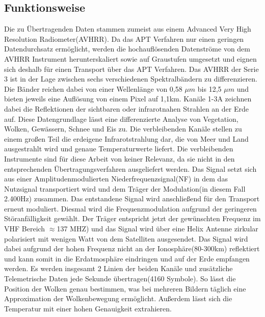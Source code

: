 \subsection*{Funktionsweise}
\begin{multicols*}{2}
    Die zu Übertragenden Daten stammen zumeist aus einem \glqq Advanced Very High Resolution Radiometer\grqq (AVHRR). Da das APT Verfahren nur einen geringen Datendurchsatz ermöglicht, werden die hochauflösenden Datenströme von dem AVHRR Instrument herunterskaliert sowie auf Graustufen umgesetzt und eignen sich deshalb für einen Transport über das APT Verfahren. Das AVHRR der Serie 3 ist in der Lage zwischen sechs verschiedenen Spektralbändern zu differenzieren. Die Bänder reichen dabei von einer Wellenlänge von 0,58 \( \mu m\) bis 12,5 \( \mu m\) und bieten jeweils eine Auflösung von einem Pixel auf 1,1km. Kanäle 1-3A zeichnen dabei die Reflektionen der sichtbaren oder infrarotnahen Strahlen an der Erde auf. 
    Diese Datengrundlage lässt eine differenzierte Analyse von Vegetation, Wolken, Gewässern, Schnee und Eis zu. Die verbleibenden Kanäle stellen zu einem großen Teil die erdeigene Infrarotstrahlung dar, die von Meer und Land ausgestrahlt wird und genaue Temperaturwerte liefert. 
    Die verbleibenden Instrumente sind für diese Arbeit von keiner Relevanz, da sie nicht in den entsprechenden Übertragungsverfahren ausgeliefert werden. 
    \cite{Apt-System} 
    Das Signal setzt sich aus einer Amplitudenmodulierten Niederfrequenzsignal(NF) in dem das Nutzsignal transportiert wird und dem Träger der Modulation(in diesem Fall 2.400Hz) zusammen. Das entstandene Signal wird anschließend für den Transport erneut moduliert. Diesmal wird die Frequenzmodulation aufgrund der geringeren Störanfälligkeit gewählt. Der Träger entspricht jetzt der gewünschten Frequenz im VHF Bereich \( \approx  \)137 MHZ) und das Signal wird über eine Helix Antenne zirkular polarisiert mit wenigen Watt von dem Satelliten ausgesendet. Das Signal wird dabei aufgrund der hohen Frequenz nicht an der Ionosphäre(80-300km) reflektiert und kann somit in die Erdatmosphäre eindringen und auf der Erde empfangen werden. Es werden insgesamt 2 Linien der beiden Kanäle und zusätzliche Telemetrische Daten jede Sekunde übertragen(4160 Symbole). So lässt die Position der Wolken genau bestimmen, was bei mehreren Bildern täglich eine Approximation der Wolkenbewegung ermöglicht. Außerdem lässt sich die Temperatur mit einer hohen Genauigkeit extrahieren. 
    \cite{APT-How_it_works}

\end{multicols*}

